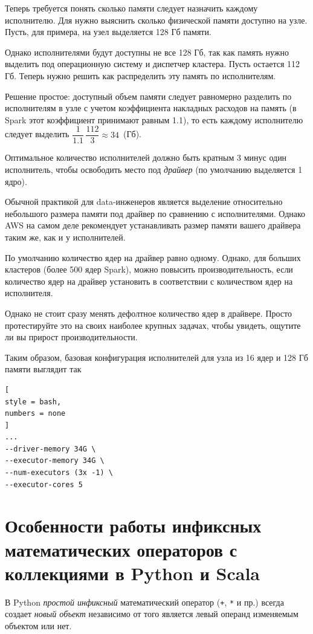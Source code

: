 \documentclass[%
	11pt,
	a4paper,
	utf8,
		]{article}
\begin{document}
Теперь требуется понять сколько памяти следует назначить каждому исполнителю. Для нужно выяснить сколько физической памяти доступно на узле. Пусть, для примера, на узел выделяется 128 Гб памяти.

Однако исполнителями будут доступны не все 128 Гб, так как память нужно выделить под операционную систему и диспетчер кластера. Пусть остается 112 Гб. Теперь нужно решить как распределить эту память по исполнителям.

Решение простое: доступный объем памяти следует равномерно разделить по исполнителям в узле с учетом коэффициента накладных расходов на память (в Spark этот коэффициент принимают равным 1.1), то есть  каждому исполнителю следует выделить $ \dfrac{1}{1.1}\, \dfrac{112}{3} \approx 34$~(Гб).

Оптимальное количество исполнителей должно быть кратным 3 минус один исполнитель, чтобы освободить место под \emph{драйвер} (по умолчанию выделяется 1 ядро).

Обычной практикой для data-инженеров является выделение относительно небольшого размера памяти под драйвер по сравнению с исполнителями. Однако AWS на самом деле рекомендует устанавливать размер памяти вашего драйвера таким же, как и у исполнителей.

По умолчанию количество ядер на драйвер равно одному. Однако, для больших кластеров (более 500 ядер Spark), можно повысить производительность, если количество ядер на драйвер установить в соответствии с количеством ядер на исполнителя. 

Однако не стоит сразу менять дефолтное количество ядер в драйвере. Просто протестируйте это на своих наиболее крупных задачах, чтобы увидеть, ощутите ли вы прирост производительности.

Таким образом, базовая конфигурация исполнителей для узла из 16 ядер и 128 Гб памяти выглядит так
\begin{lstlisting}[
style = bash,
numbers = none	
]
...
--driver-memory 34G \
--executor-memory 34G \
--num-executors (3x -1) \
--executor-cores 5
\end{lstlisting}





\section{Особенности работы инфиксных математических операторов с коллекциями в Python и Scala}

В Python \emph{простой инфиксный} математический оператор (\texttt{+}, \texttt{*} и пр.) всегда создает \emph{новый объект} независимо от того является левый операнд изменяемым объектом или нет.
\end{document}

